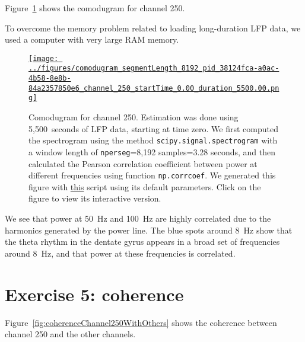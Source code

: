 \documentclass[12pt]{article}
\begin{document}
Figure~\ref{fig:comodugramChannel250} shows the comodugram for channel 250.

To overcome the memory problem related to loading long-duration LFP data,
we used a computer with very large RAM memory.

\begin{figure}[H]
    \begin{center}
        \href{https://www.gatsby.ucl.ac.uk/~rapela/neuroinformatics/2023/ws3/figures/comodugram_segmentLength_8192_pid_38124fca-a0ac-4b58-8e8b-84a2357850e6_channel_250_startTime_0.00_duration_5500.00.html}{\texttt{[image: ../figures/comodugram\_segmentLength\_8192\_pid\_38124fca-a0ac-4b58-8e8b-84a2357850e6\_channel\_250\_startTime\_0.00\_duration\_5500.00.png]}}



        \caption{Comodugram for channel 250. Estimation was done using
        5,500~seconds of LFP data, starting at time zero. We first computed the
        spectrogram using the method \texttt{scipy.signal.spectrogram} with a
        window length of \texttt{nperseg}=8,192 samples=3.28 seconds, and then
        calculated the Pearson correlation coefficient between power at
        different frequencies using function \texttt{np.corrcoef}.  We
        generated this figure with
        \href{https://github.com/joacorapela/neuroinformatics23/blob/master/worksheets/ws3/mySolution/code/scripts/doPlotComodugram.py}{this}
        script using its default parameters.  Click on the figure to view its
        interactive version.  }

                \label{fig:comodugramChannel250}

            \end{center}
        \end{figure}

We see that power at 50~Hz and 100~Hz are highly correlated due to the
harmonics generated by the power line. The blue spots around 8~Hz show that
the theta rhythm in the dentate gyrus appears in a broad set of frequencies
around 8~Hz, and that power at these frequencies is correlated.

\section*{Exercise 5: coherence}

Figure~\ref{fig:coherenceChannel250WithOthers} shows the coherence between
channel 250 and the other channels.
\end{document}
